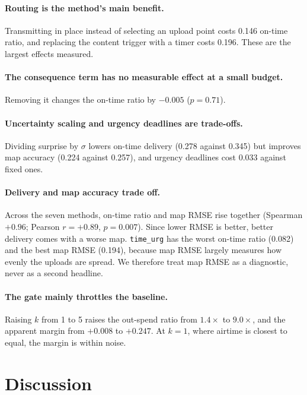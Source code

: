 \documentclass[pdflatex,sn-mathphys-num,iicol]{sn-jnl}
\theoremstyle{thmstyleone}
\theoremstyle{thmstyletwo}
\theoremstyle{thmstylethree}
\begin{document}
\paragraph{Routing is the method's main benefit.} Transmitting in place instead of
selecting an upload point costs 0.146 on-time ratio, and replacing the content trigger with
a timer costs 0.196. These are the largest effects measured.

\paragraph{The consequence term has no measurable effect at a small budget.} Removing it
changes the on-time ratio by $-0.005$ ($p = 0.71$).

\paragraph{Uncertainty scaling and urgency deadlines are trade-offs.} Dividing surprise by
$\sigma$ lowers on-time delivery (0.278 against 0.345) but improves map accuracy (0.224
against 0.257), and urgency deadlines cost 0.033 against fixed ones.

\paragraph{Delivery and map accuracy trade off.} Across the seven methods, on-time ratio and
map RMSE rise together (Spearman $+0.96$; Pearson $r = +0.89$, $p = 0.007$). Since lower
RMSE is better, better delivery comes with a worse map. \texttt{time\_urg} has the worst
on-time ratio (0.082) and the best map RMSE (0.194), because map RMSE largely measures how
evenly the uploads are spread. We therefore treat map RMSE as a diagnostic, never as a
second headline.

\paragraph{The gate mainly throttles the baseline.} Raising $k$ from 1 to 5 raises the
out-spend ratio from $1.4\times$ to $9.0\times$, and the apparent margin from $+0.008$ to
$+0.247$. At $k=1$, where airtime is closest to equal, the margin is within noise.

\section{Discussion}\label{sec:discussion}
\end{document}

